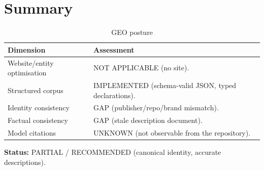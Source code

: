 \section{Summary}

\begin{table}[H]
\centering
\caption{GEO posture}
\begin{tabular}{@{}L{4.6cm}L{9.6cm}@{}}
\toprule
\textbf{Dimension} & \textbf{Assessment} \\
\midrule
Website/entity optimisation & NOT APPLICABLE (no site). \\
Structured corpus & IMPLEMENTED (schema-valid JSON, typed declarations). \\
Identity consistency & GAP (publisher/repo/brand mismatch). \\
Factual consistency & GAP (stale description document). \\
Model citations & UNKNOWN (not observable from the repository). \\
\bottomrule
\end{tabular}
\end{table}

\textbf{Status:} PARTIAL / RECOMMENDED (canonical identity, accurate descriptions).
